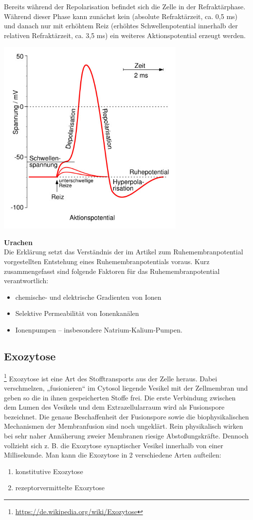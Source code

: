 Bereits während der Repolarisation befindet sich die Zelle in der Refraktärphase. Während dieser Phase kann zunächst kein (absolute Refraktärzeit, ca. 0,5 ms) und danach nur mit erhöhtem Reiz (erhöhtes Schwellenpotential innerhalb der relativen Refraktärzeit, ca. 3,5 ms) ein weiteres Aktionspotential erzeugt werden.

\includegraphics[width=0.7\textwidth]{lectures/160405/pix/Aktionspotential.jpg}

\textbf{Urachen}\\
Die Erklärung setzt das Verständnis der im Artikel zum Ruhemembranpotential vorgestellten Entstehung eines Ruhemembranpotentials voraus. Kurz zusammengefasst sind folgende Faktoren für das Ruhemembranpotential verantwortlich:
\begin{itemize}
    \item chemische- und elektrische Gradienten von Ionen
    \item Selektive Permeabilität von Ionenkanälen
    \item Ionenpumpen – insbesondere Natrium-Kalium-Pumpen.
\end{itemize}

\subsection{Exozytose}\footnote{\url{https://de.wikipedia.org/wiki/Exozytose}} Exozytose ist eine Art des Stofftransports aus der Zelle heraus. Dabei verschmelzen, „fusionieren“ im Cytosol liegende Vesikel mit der Zellmembran und geben so die in ihnen gespeicherten Stoffe frei. Die erste Verbindung zwischen dem Lumen des Vesikels und dem Extrazellularraum wird als Fusionspore bezeichnet. Die genaue Beschaffenheit der Fusionspore sowie die biophysikalischen Mechanismen der Membranfusion sind noch ungeklärt. Rein physikalisch wirken bei sehr naher Annäherung zweier Membranen riesige Abstoßungskräfte. Dennoch vollzieht sich z. B. die Exozytose synaptischer Vesikel innerhalb von einer Millisekunde.
Man kann die Exozytose in 2 verschiedene Arten aufteilen:
\begin{enumerate}
	\item konstitutive Exozytose
	\item rezeptorvermittelte Exozytose
\end{enumerate}

